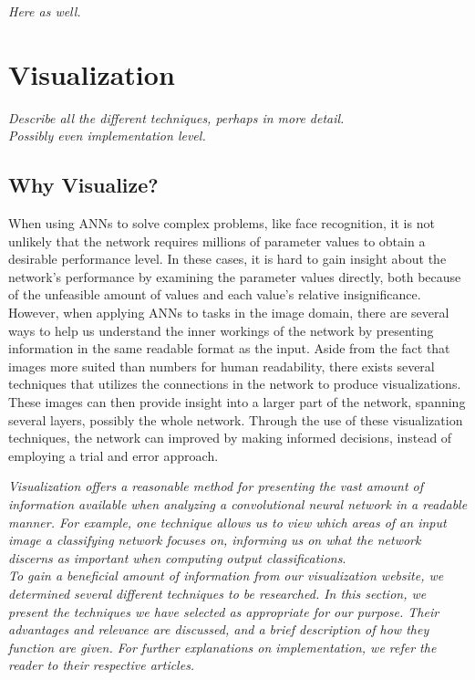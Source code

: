 \textit{Here as well.}

\section{Visualization}
\textit{Describe all the different techniques, perhaps in more detail. \\
Possibly even implementation level.}

\subsection{Why Visualize?}

When using ANNs to solve complex problems, like face recognition, it is not unlikely that the network requires millions of parameter values to obtain a desirable performance level. In these cases, it is hard to gain insight about the network's performance by examining the parameter values directly, both because of the unfeasible amount of values and each value's relative insignificance. However, when applying ANNs to tasks in the image domain, there are several ways to help us understand the inner workings of the network by presenting information in the same readable format as the input. Aside from the fact that images more suited than numbers for human readability, there exists several techniques that utilizes the connections in the network to produce visualizations. These images can then provide insight into a larger part of the network, spanning several layers, possibly the whole network. Through the use of these visualization techniques, the network can improved by making informed decisions, instead of employing a trial and error approach.

\textit{Visualization offers a reasonable method for presenting the vast amount of information available when analyzing a convolutional neural network in a readable manner. For example, one technique allows us to view which areas of an input image a classifying network focuses on, informing us on what the network discerns as important when computing output classifications}. \\

\noindent \textit{To gain a beneficial amount of information from our visualization website, we determined several different techniques to be researched. In this section, we present the techniques we have selected as appropriate for our purpose. Their advantages and relevance are discussed, and a brief description of how they function are given. For further explanations on implementation, we refer the reader to their respective articles.} 

